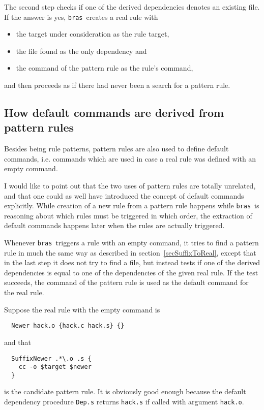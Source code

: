 \documentclass[12pt]{article}
\newcommand{\bras}{\texttt{bras}}
\begin{document}
The second step checks if one of
the derived dependencies denotes an existing file.
If the answer is yes, \bras\ creates a real rule with
\begin{itemize}
\item the target under consideration as the rule target,
\item the file found as the only dependency and
\item the command of the pattern rule as the rule's command,
\end{itemize}
and then proceeds as if there had never been a search for a pattern
rule.

\subsection{How default commands are derived from pattern rules}
\label{secSuffixAsDefCmd}
Besides being rule patterns, pattern rules are also used to define
default commands, i.e. commands which are used in case a real rule was
defined with an empty command.

I would like to point out that the two uses of pattern rules are
totally unrelated, and that one could as well have introduced the
concept of default commands explicitly. While creation of a new rule
from a pattern rule happens while \bras\ is reasoning about which rules
must be triggered in which order, the extraction of default commands
happens later when the rules are actually triggered. 

Whenever \bras\ triggers a rule with an empty command, it tries to
find a pattern rule in much the same way as described in
section~\ref{secSuffixToReal}, except that in the last step it does
not try to find a file, but instead tests if one of the derived
dependencies is equal to one of the dependencies of the given real
rule. If the test succeeds, the command of the pattern rule is used as
the default command for the real rule.

Suppose the real rule with the empty command is
\begin{verbatim}
  Newer hack.o {hack.c hack.s} {}
\end{verbatim}
and that
\begin{verbatim}
  SuffixNewer .*\.o .s {
    cc -o $target $newer
  }
\end{verbatim}
is the candidate pattern rule. It is obviously good enough
because the default dependency procedure \texttt{Dep.s} returns
\texttt{hack.s} if called with argument \texttt{hack.o}.
\end{document}
